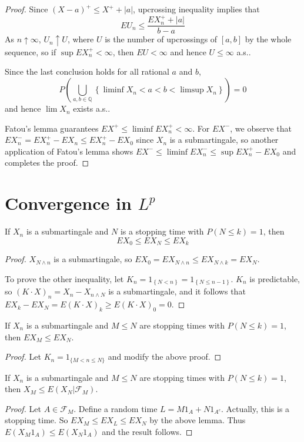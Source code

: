 \begin{proof}
Since $(X-a)^+\le X^++\left|a\right|$, upcrossing inequality implies that \[EU_n\le \frac{ EX^+_n+\left|a\right|}{b-a}\]
As $n\uparrow\infty$, $U_n\uparrow U$, where $U$ is the number of upcrossings of $[a,b]$ by the whole sequence, so if $\sup EX_n^+<\infty$, then $EU<\infty$ and hence $U\le\infty$ a.s..\par
Since the last conclusion holds for all rational $a$ and $b$,\[P(\bigcup_{a,b\in\mathbb{Q}}\left\{\liminf X_n<a<b<\limsup X_n\right\})=0\]
and hence $\lim X_n$ exists a.s..\par
Fatou's lemma guarantees $EX^+\le\liminf EX_n^+<\infty$. For $EX^-$, we observe that $EX_n^-=EX_n^+-EX_n\le EX_n^+-EX_0$ since $X_n$ is a submartingale, so another application of Fatou's lemma shows $EX^-\le\liminf EX^-_n\le \sup EX_n^+-EX_0$ and completes the proof.
\end{proof}
\section{\texorpdfstring{Convergence in $L^p$}{Convergence in Lp}}
\begin{lemma}\label{Bounded Optional Stopping}
If $X_n$ is a submartingale and $N$ is a stopping time with $P(N\le k)=1$, then \[EX_0\le EX_N\le EX_k\]
\end{lemma}
\begin{proof}
$X_{N\wedge n}$ is a submartingale, so $EX_0=EX_{N\wedge n}\le EX_{N\wedge k}=EX_N$.\par
To prove the other inequality, let $K_n=1_{\left\{N<n\right\}}=1_{\left\{N\le n-1\right\}}$. $K_n$ is predictable, so $(K\cdot X)_n=X_n-X_{n\wedge N}$ is a submartingale, and it follows that $EX_k-EX_N=E(K\cdot X)_k\geq E(K\cdot X)_0=0$.
\end{proof}
\begin{lemma}
    If $X_n$ is a submartingale and $M\le N$ are stopping times with $P(N\le k)=1$,
    then $EX_M\le EX_N$.
\end{lemma}
\begin{proof}
    Let $K_n=1_{\{M<n\le N\}}$ and modify the above proof.
\end{proof}
\begin{lemma}
    If $X_n$ is a submartingale and $M\le N$ are stopping times with $P(N\le k)=1$,
    then $X_M\le E(X_N|\mathcal{F}_M)$.
\end{lemma}
\begin{proof}
    Let $A\in\mathcal{F}_M$. Define a random time $L=M 1_A +N 1_{A^c}$. Actually, this is a stopping time.
    So $EX_M\le EX_L\le EX_N$ by the above lemma. Thus $E(X_M 1_A)\le E(X_N 1_A)$ and the result follows.
\end{proof}

